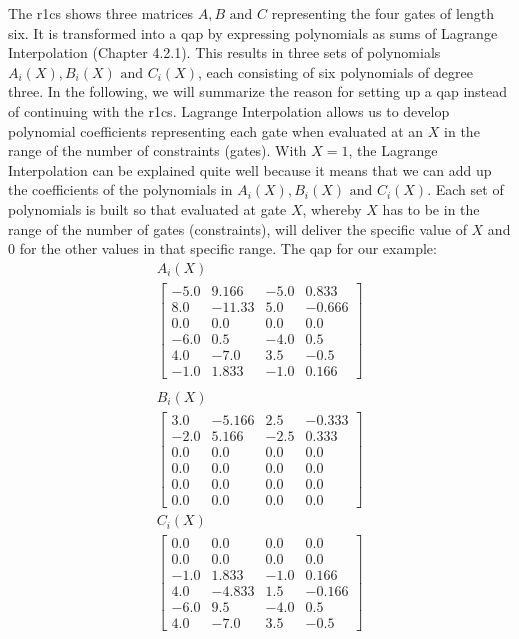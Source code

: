 The \acrshort{r1cs} shows three matrices \(A, B \text{ and }C\) representing the four gates of length six. It is transformed into a \acrshort{qap} by expressing polynomials as sums of Lagrange Interpolation (Chapter 4.2.1). This results in three sets of polynomials \(A_i(X), B_i(X) \text{ and }C_i(X)\), each consisting of six polynomials of degree three. In the following, we will summarize the reason for setting up a \acrshort{qap} instead of continuing with the \acrshort{r1cs}. Lagrange Interpolation allows us to develop polynomial coefficients representing each gate when evaluated at an \(X\) in the range of the number of constraints (gates). With \(X = 1\), the Lagrange Interpolation can be explained quite well because it means that we can add up the coefficients of the polynomials in \(A_i(X), B_i(X) \text{ and }C_i(X)\). Each set of polynomials is built so that evaluated at gate \(X\), whereby \(X\) has to be in the range of the number of gates (constraints), will deliver the specific value of \(X\) and 0 for the other values in that specific range.\newline
The \acrshort{qap} for our example:
\begin{align*}
    A_i(X) \\
    \begin{bmatrix}
        -5.0 & 9.166 & -5.0 & 0.833 \\
        8.0 & -11.33 & 5.0 & -0.666 \\
        0.0 & 0.0 & 0.0 & 0.0 \\
        -6.0 & 0.5 & -4.0 & 0.5 \\
        4.0 & -7.0 & 3.5 & -0.5 \\
        -1.0 & 1.833 & -1.0 & 0.166
    \end{bmatrix} \\
\end{align*}
\begin{align*}
        B_i(X) \\
    \begin{bmatrix}
        3.0 & -5.166 & 2.5 & -0.333 \\
        -2.0 & 5.166 & -2.5 & 0.333 \\
        0.0 & 0.0 & 0.0 & 0.0 \\
        0.0 & 0.0 & 0.0 & 0.0 \\
        0.0 & 0.0 & 0.0 & 0.0 \\
        0.0 & 0.0 & 0.0 & 0.0
    \end{bmatrix}
\end{align*}
\begin{align*}
        C_i(X) \\
    \begin{bmatrix}
        0.0 & 0.0 & 0.0 & 0.0 \\
        0.0 & 0.0 & 0.0 & 0.0 \\
        -1.0 & 1.833 & -1.0 & 0.166 \\
        4.0 & -4.833 & 1.5 & -0.166 \\
        -6.0 & 9.5 & -4.0 & 0.5 \\
        4.0 & -7.0 & 3.5 & -0.5
    \end{bmatrix}
\end{align*}
